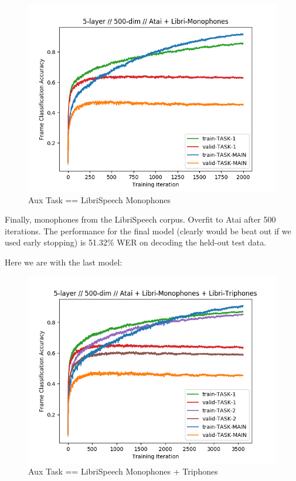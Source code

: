 \documentclass[a4paper]{article}
\begin{document}
\begin{figure}[!htb]
  \centering
{}
  \includegraphics[width=\linewidth]{figs/atai-librimonophones.png}
  \caption{Aux Task == LibriSpeech Monophones}
\endminipage\hfill
\end{figure}


Finally, monophones from the LibriSpeech corpus. Overfit to Atai after 500 iterations. The performance for the final model (clearly would be beat out if we used early stopping) is 51.32\% WER on decoding the held-out test data.



Here we are with the last model:


\begin{figure}[!htb]
  \centering
{}
  \includegraphics[width=\linewidth]{figs/atai-libritriphones-librimonophones.png}
  \caption{Aux Task == LibriSpeech Monophones + Triphones}
\endminipage\hfill
\end{figure}
\end{document}
